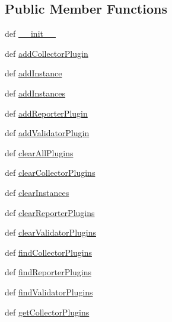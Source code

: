 \subsection*{\-Public \-Member \-Functions}
\begin{DoxyCompactItemize}
\item 
def \hyperlink{classassetQC_1_1api_1_1context_1_1Context_a25b82c3dbba7587f0dade9cd3019b002}{\-\_\-\-\_\-init\-\_\-\-\_\-}
\item 
def \hyperlink{classassetQC_1_1api_1_1context_1_1Context_aaea8bba814dd355e79caccda9fe8b974}{add\-Collector\-Plugin}
\item 
def \hyperlink{classassetQC_1_1api_1_1context_1_1Context_a5e15b03c2dd2a34601057b410b49d6a3}{add\-Instance}
\item 
def \hyperlink{classassetQC_1_1api_1_1context_1_1Context_a18e6d58adb32548bf8563747104c908f}{add\-Instances}
\item 
def \hyperlink{classassetQC_1_1api_1_1context_1_1Context_aa8e9236c536164033ce521847fbccdd4}{add\-Reporter\-Plugin}
\item 
def \hyperlink{classassetQC_1_1api_1_1context_1_1Context_a27eaaee7b650e9faf9b183e36ccad502}{add\-Validator\-Plugin}
\item 
def \hyperlink{classassetQC_1_1api_1_1context_1_1Context_a41d58dfb93876f4190c99221fe95e32b}{clear\-All\-Plugins}
\item 
def \hyperlink{classassetQC_1_1api_1_1context_1_1Context_ab76d75fee36fd8b2c3fbddd221854a5c}{clear\-Collector\-Plugins}
\item 
def \hyperlink{classassetQC_1_1api_1_1context_1_1Context_a4779fb0b263714f5df0ed33be55c2b1c}{clear\-Instances}
\item 
def \hyperlink{classassetQC_1_1api_1_1context_1_1Context_af3e1da1d7b1ff5cca18148c7a8a2c3bb}{clear\-Reporter\-Plugins}
\item 
def \hyperlink{classassetQC_1_1api_1_1context_1_1Context_adb43964bdd272e16ddc8658e7b9eb6e3}{clear\-Validator\-Plugins}
\item 
def \hyperlink{classassetQC_1_1api_1_1context_1_1Context_a6aea45cf03f01c38b61eb3793b86815b}{find\-Collector\-Plugins}
\item 
def \hyperlink{classassetQC_1_1api_1_1context_1_1Context_affddcbd66b0e2524538e5201c4e34914}{find\-Reporter\-Plugins}
\item 
def \hyperlink{classassetQC_1_1api_1_1context_1_1Context_a8383e20923db08819dc7f28c09228541}{find\-Validator\-Plugins}
\item 
def \hyperlink{classassetQC_1_1api_1_1context_1_1Context_a26e440825b8a5ba3fb79e033dc148f4f}{get\-Collector\-Plugins}

\end{DoxyCompactItemize}

